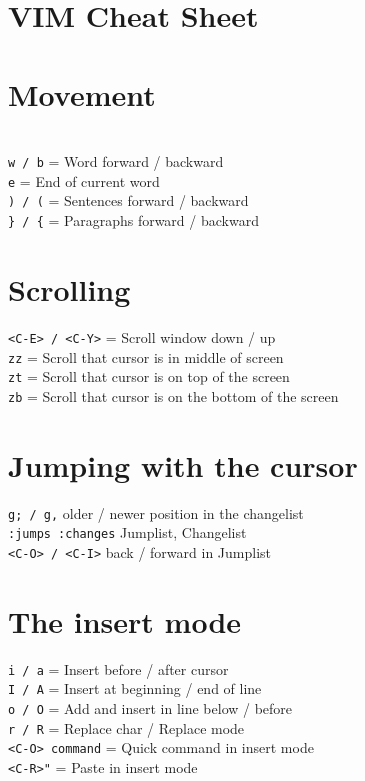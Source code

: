 \documentclass[10pt,DIV=50,landscape,pagesize,parskip=off]{scrartcl}
\newcommand\co[1]{\texttt{#1}}
\newcommand\coe[2]{\co{#1} = #2}
\begin{document}
\section*{{\Huge {}VIM Cheat Sheet}}
\begin{multicols}{3}
\section{Movement}
\\
\coe{w / b}{Word forward / backward}\\
\coe{e}{End of current word}\\
\coe{) / (}{Sentences forward / backward}\\
\coe{\} / \{}{Paragraphs forward / backward}

\section{Scrolling}
\coe{<C-E> / <C-Y>}{Scroll window down / up}\\
\coe{zz}{Scroll that cursor is in middle of screen}\\
\coe{zt}{Scroll that cursor is on top of the screen}\\
\coe{zb}{Scroll that cursor is on the bottom of the screen}

\section{Jumping with the cursor}
\lstinline|g; / g,| older / newer position in the changelist \\
\lstinline|:jumps :changes| Jumplist, Changelist\\
\lstinline|<C-O> / <C-I>| back / forward in Jumplist

\section{The insert mode}
\coe{i / a}{Insert before / after cursor}\\
\coe{I / A}{Insert at beginning / end of line}\\
\coe{o / O}{Add and insert in line below / before}\\
\coe{r / R}{Replace char / Replace mode} \\
\lstinline|<C-O> command| = Quick command in insert mode \\
\lstinline|<C-R>"| = Paste in insert mode


\end{multicols}
\end{document}
